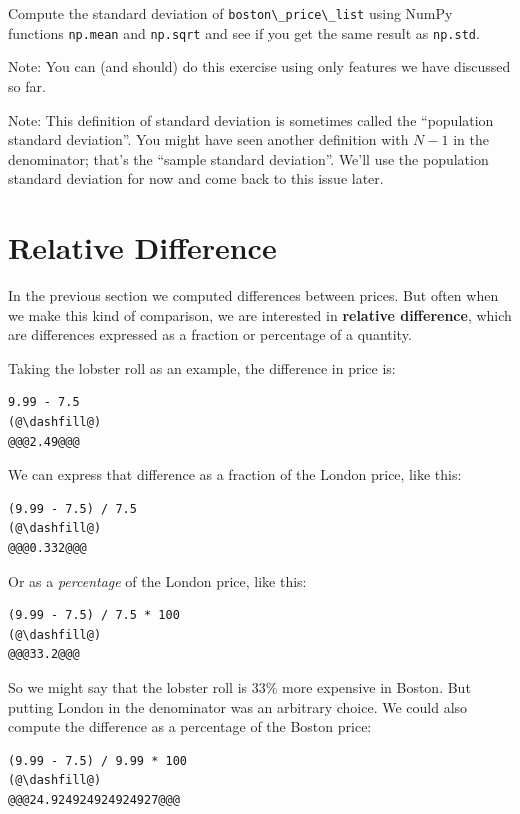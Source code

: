 Compute the standard deviation of
\passthrough{\lstinline!boston\_price\_list!} using NumPy functions
\passthrough{\lstinline!np.mean!} and \passthrough{\lstinline!np.sqrt!}
and see if you get the same result as \passthrough{\lstinline!np.std!}.

Note: You can (and should) do this exercise using only features we have
discussed so far.

Note: This definition of standard deviation is sometimes called the
``population standard deviation''. You might have seen another
definition with \(N-1\) in the denominator; that's the ``sample standard
deviation''. We'll use the population standard deviation for now and
come back to this issue later.

\hypertarget{relative-difference}{%
\section{Relative Difference}\label{relative-difference}}

In the previous section we computed differences between prices. But
often when we make this kind of comparison, we are interested in
\textbf{relative difference}, which are differences expressed as a
fraction or percentage of a quantity.

Taking the lobster roll as an example, the difference in price is:

\begin{lstlisting}[]
9.99 - 7.5
(@\dashfill@)
@@@2.49@@@
\end{lstlisting}

We can express that difference as a fraction of the London price, like
this:

\begin{lstlisting}[]
(9.99 - 7.5) / 7.5
(@\dashfill@)
@@@0.332@@@
\end{lstlisting}

Or as a \emph{percentage} of the London price, like this:

\begin{lstlisting}[]
(9.99 - 7.5) / 7.5 * 100
(@\dashfill@)
@@@33.2@@@
\end{lstlisting}

So we might say that the lobster roll is 33\% more expensive in Boston.
But putting London in the denominator was an arbitrary choice. We could
also compute the difference as a percentage of the Boston price:

\begin{lstlisting}[]
(9.99 - 7.5) / 9.99 * 100
(@\dashfill@)
@@@24.924924924924927@@@
\end{lstlisting}


